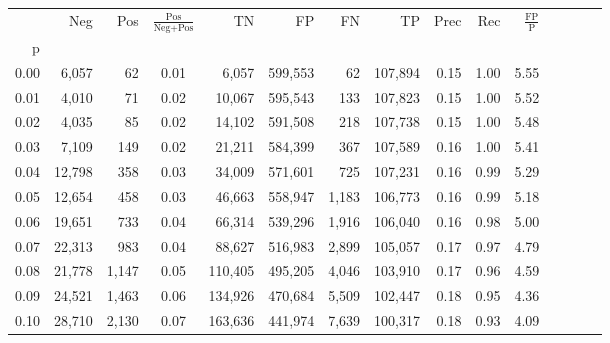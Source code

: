 \begin{tabular}{rrrcrrrrrrrrrrr}
\toprule
{} &     Neg &    Pos & $\frac{\text{Pos}}{\text{Neg}+\text{Pos}}$ &       TN &       FP &       FN &       TP &  Prec &   Rec & $\frac{\text{FP}}{\text{P}}$ \\
p    &         &        &                                            &          &          &          &          &       &       &                              \\
\midrule
0.00 &   6,057 &     62 &                                       0.01 &    6,057 &  599,553 &       62 &  107,894 &  0.15 &  1.00 &                         5.55 \\
0.01 &   4,010 &     71 &                                       0.02 &   10,067 &  595,543 &      133 &  107,823 &  0.15 &  1.00 &                         5.52 \\
0.02 &   4,035 &     85 &                                       0.02 &   14,102 &  591,508 &      218 &  107,738 &  0.15 &  1.00 &                         5.48 \\
0.03 &   7,109 &    149 &                                       0.02 &   21,211 &  584,399 &      367 &  107,589 &  0.16 &  1.00 &                         5.41 \\
0.04 &  12,798 &    358 &                                       0.03 &   34,009 &  571,601 &      725 &  107,231 &  0.16 &  0.99 &                         5.29 \\
0.05 &  12,654 &    458 &                                       0.03 &   46,663 &  558,947 &    1,183 &  106,773 &  0.16 &  0.99 &                         5.18 \\
0.06 &  19,651 &    733 &                                       0.04 &   66,314 &  539,296 &    1,916 &  106,040 &  0.16 &  0.98 &                         5.00 \\
0.07 &  22,313 &    983 &                                       0.04 &   88,627 &  516,983 &    2,899 &  105,057 &  0.17 &  0.97 &                         4.79 \\
0.08 &  21,778 &  1,147 &                                       0.05 &  110,405 &  495,205 &    4,046 &  103,910 &  0.17 &  0.96 &                         4.59 \\
0.09 &  24,521 &  1,463 &                                       0.06 &  134,926 &  470,684 &    5,509 &  102,447 &  0.18 &  0.95 &                         4.36 \\
0.10 &  28,710 &  2,130 &                                       0.07 &  163,636 &  441,974 &    7,639 &  100,317 &  0.18 &  0.93 &                         4.09 \\

\end{tabular}

